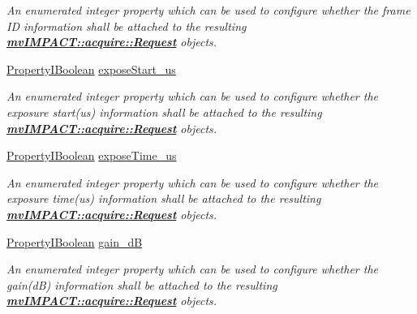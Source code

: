 \begin{DoxyCompactItemize}
\begin{DoxyCompactList}\small\item\em An enumerated integer property which can be used to configure whether the frame I\+D information shall be attached to the resulting {\bfseries \hyperlink{classmv_i_m_p_a_c_t_1_1acquire_1_1_request}{mv\+I\+M\+P\+A\+C\+T\+::acquire\+::\+Request}} objects. \end{DoxyCompactList}\item 
\hyperlink{group___common_interface_ga44f9437e24b21b6c93da9039ec6786aa}{Property\+I\+Boolean} \hyperlink{classmv_i_m_p_a_c_t_1_1acquire_1_1_request_info_configuration_a8a9346db78d37ad1e9809bd0bd65342b}{expose\+Start\+\_\+us}
\begin{DoxyCompactList}\small\item\em An enumerated integer property which can be used to configure whether the exposure start(us) information shall be attached to the resulting {\bfseries \hyperlink{classmv_i_m_p_a_c_t_1_1acquire_1_1_request}{mv\+I\+M\+P\+A\+C\+T\+::acquire\+::\+Request}} objects. \end{DoxyCompactList}\item 
\hyperlink{group___common_interface_ga44f9437e24b21b6c93da9039ec6786aa}{Property\+I\+Boolean} \hyperlink{classmv_i_m_p_a_c_t_1_1acquire_1_1_request_info_configuration_a059547e3e05d693271cc225d7b6dcd81}{expose\+Time\+\_\+us}
\begin{DoxyCompactList}\small\item\em An enumerated integer property which can be used to configure whether the exposure time(us) information shall be attached to the resulting {\bfseries \hyperlink{classmv_i_m_p_a_c_t_1_1acquire_1_1_request}{mv\+I\+M\+P\+A\+C\+T\+::acquire\+::\+Request}} objects. \end{DoxyCompactList}\item 
\hyperlink{group___common_interface_ga44f9437e24b21b6c93da9039ec6786aa}{Property\+I\+Boolean} \hyperlink{classmv_i_m_p_a_c_t_1_1acquire_1_1_request_info_configuration_a74da6fdc9ad3e5c77874fa02ff7a8409}{gain\+\_\+d\+B}
\begin{DoxyCompactList}\small\item\em An enumerated integer property which can be used to configure whether the gain(d\+B) information shall be attached to the resulting {\bfseries \hyperlink{classmv_i_m_p_a_c_t_1_1acquire_1_1_request}{mv\+I\+M\+P\+A\+C\+T\+::acquire\+::\+Request}} objects. \end{DoxyCompactList}\item 

\end{DoxyCompactItemize}
